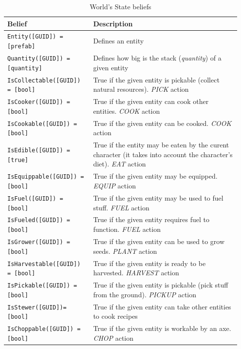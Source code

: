 \begin{table}[htb]
	\centering
    \caption{World's State beliefs}
    \label{tab:world-state-beliefs}
    \begin{tabular}{ | p{0.35\linewidth} | p{0.6\linewidth} | }
        \hline 
        \textbf{Belief} & \textbf{Description} \\ \hline \hline
        \texttt{Entity([GUID]) = [prefab]} & Defines an entity \\ \hline 
        \texttt{Quantity([GUID]) = [quantity]} & Defines how big is the stack (\textit{quantity}) of a given entity \\ \hline 
        \texttt{IsCollectable([GUID]) = [bool]} & True if the given entity is pickable (collect natural resources). \textit{PICK} action \\ \hline 
        \texttt{IsCooker([GUID]) = [bool]} & True if the given entity can cook other entities. \textit{COOK} action \\ \hline 
        \texttt{IsCookable([GUID]) = [bool]} & True if the given entity can be cooked. \textit{COOK} action \\ \hline 
        \texttt{IsEdible([GUID]) = [true]} & True if the entity may be eaten by the curent character (it takes into account the character's diet). \textit{EAT} action \\ \hline 
        \texttt{IsEquippable([GUID]) = [bool]} & True if the given entity may be equipped. \textit{EQUIP} action \\ \hline 
        \texttt{IsFuel([GUID]) = [bool]} & True if the given entity may be used to fuel stuff. \textit{FUEL} action \\ \hline 
        \texttt{IsFueled([GUID]) = [bool]} & True if the given entity requires fuel to function. \textit{FUEL} action \\ \hline 
        \texttt{IsGrower([GUID]) = [bool]} & True if the given entity can be used to grow seeds. \textit{PLANT} action \\ \hline 
        \texttt{IsHarvestable([GUID]) = [bool]} & True if the given entity is ready to be harvested. \textit{HARVEST} action \\ \hline 
        \texttt{IsPickable([GUID]) = [bool]} & True if the given entity is pickable (pick stuff from the ground). \textit{PICKUP} action \\ \hline 
        \texttt{IsStewer([GUID])= [bool]} & True if the given entity can take other entities to cook recipes \\ \hline 
        \texttt{IsChoppable([GUID]) = [bool]} & True if the given entity is workable by an axe. \textit{CHOP} action \\ \hline 

\end{tabular}
\end{table}
